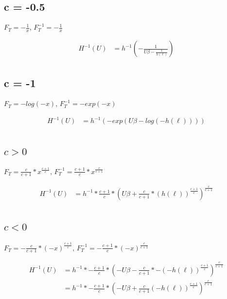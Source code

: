 \documentclass[]{article}
\begin{document}
\subsection{c = -0.5}

$F_T = -\frac{1}{x}$, $F_T^{-1} = - \frac{1}{x}$

\begin{align*}
H^{-1}(U) &= h^{-1} \left( - \frac{1}{U\beta - \frac{1}{h(\ell)}} \right) \\
\end{align*}


\subsection{c = -1}

$F_T =-log(-x)$, $F_T^{-1} = -exp(-x)$

\begin{align*}
H^{-1}(U) &= h^{-1} \left( - exp \left( U\beta - log(-h(\ell)) \right) \right) \\
\end{align*}


\subsection{$c > 0$}

$F_T = \frac{c}{c + 1} * x^{\frac{c + 1}{c}}$,
$F_T^{-1} = \frac{c + 1}{c} * x^{\frac{c}{c + 1}}$


\begin{align*}
H^{-1}(U) &= h^{-1} * \frac{c + 1}{c} * \left( U\beta + \frac{c}{c + 1} * (h(\ell))^{\frac{c + 1}{c}} \right)^{\frac{c}{c + 1}} \\
\end{align*}

\subsection{$c < 0$}

$F_T = - \frac{c}{c + 1} * (-x)^{\frac{c + 1}{c}}$,
$F_T^{-1} = - \frac{c + 1}{c} * (-x)^{\frac{c}{c + 1}}$


\begin{align*}
H^{-1}(U) &= h^{-1} * - \frac{c + 1}{c} * \left(- U\beta - \frac{c}{c + 1} * - (-h(\ell))^{\frac{c + 1}{c}} \right)^{\frac{c}{c + 1}} \\
&= h^{-1} * - \frac{c + 1}{c} * \left(- U\beta + \frac{c}{c + 1} (-h(\ell))^{\frac{c + 1}{c}} \right)^{\frac{c}{c + 1}} \\
\end{align*}
\end{document}
